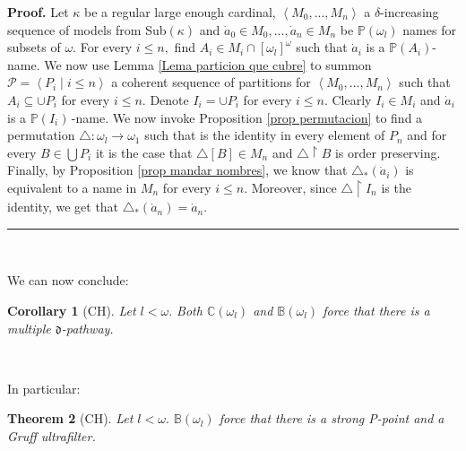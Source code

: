 \documentclass{article}%
\newtheorem{theorem}{Theorem}
\newtheorem{corollary}[theorem]{Corollary}
\newenvironment{proof}[1][Proof]{\noindent\textbf{#1.} }{\ \rule{0.5em}{0.5em}}
\begin{document}
\begin{proof}
Let $\kappa$ be a regular large enough cardinal, $\left\langle M_{0}%
,...,M_{n}\right\rangle $ a $\delta$-increasing sequence of models from
\textsf{Sub}$\left(  \kappa\right)  $ and $\dot{a}_{0}\in M_{0},...,\dot
{a}_{n}\in M_{n}$ be $\mathbb{P}\left(  \omega_{l}\right)  $ names for subsets
of $\omega.$ For every $i\leq n,$ find $A_{i}\in M_{i}\cap\left[  \omega
_{l}\right]  ^{\omega}$ such that $\dot{a}_{i}$ is a $\mathbb{P}\left(
A_{i}\right)  $-name. We now use Lemma \ref{Lema particion que cubre} to
summon $\mathcal{P}=\left\langle P_{i}\mid i\leq n\right\rangle $ a coherent
sequence of partitions for $\left\langle M_{0},...,M_{n}\right\rangle $ such
that $A_{i}\subseteq\cup P_{i}$ for every $i\leq n.$ Denote $I_{i}=\cup P_{i}$
for every $i\leq n.$ Clearly $I_{i}\in M_{i}$ and $\dot{a}_{i}$ is a
$\mathbb{P}\left(  I_{i}\right)  \,$-name. We now invoke Proposition
\ref{prop permutacion} to find a permutation $\triangle:\omega_{l}%
\longrightarrow\omega_{1}$ such that is the identity in every element of
$P_{n}$ and for every $B\in%
{\textstyle\bigcup}
P_{i}$ it is the case that $\triangle\left[  B\right]  \in M_{n}$ and
$\triangle\upharpoonright B$ is order preserving. Finally, by Proposition
\ref{prop mandar nombres}, we know that $\triangle_{\ast}\left(  \dot{a}%
_{i}\right)  $ is equivalent to a name in $M_{n}$ for every $i\leq n.$
Moreover, since $\triangle\upharpoonright I_{n}$ is the identity, we get that
$\triangle_{\ast}\left(  \dot{a}_{n}\right)  =\dot{a}_{n}.$
\end{proof}

\qquad\ \ \qquad\ \ 

We can now conclude:

\begin{corollary}
[\textsf{CH}]Let $l<\omega.$ Both $\mathbb{C}\left(  \omega_{l}\right)  $ and
$\mathbb{B}\left(  \omega_{l}\right)  $ force that there is a multiple
$\mathfrak{d}$-pathway.
\end{corollary}

\qquad\ \ \qquad

In particular:

\begin{theorem}
[\textsf{CH}]Let $l<\omega.$ $\mathbb{B}\left(  \omega_{l}\right)  $ force
that there is a strong \textsf{P}-point and a Gruff ultrafilter.
\end{theorem}

\qquad\qquad\ \ 
\end{document}

